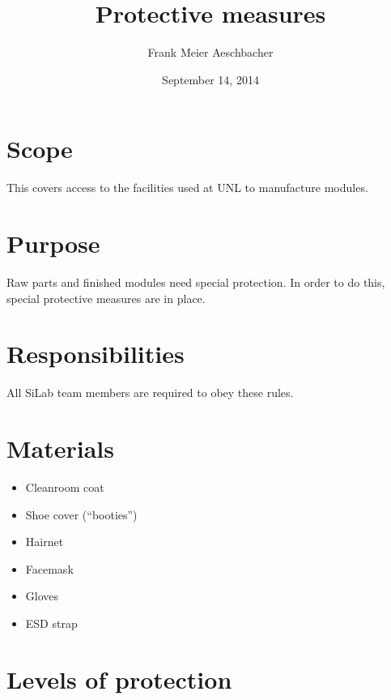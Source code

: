 \documentclass[12pt]{unlsilabsop}
\title{Protective measures}
\date{September 14, 2014}
\author{Frank Meier Aeschbacher}
\begin{document}
\maketitle

\section{Scope}
This covers access to the facilities used at UNL to manufacture modules.

\section{Purpose}
Raw parts and finished modules need special protection. In order to do this, special protective measures are in place.


\section{Responsibilities}
All SiLab team members are required to obey these rules.

\section{Materials}
\begin{itemize}
    \item Cleanroom coat
    \item Shoe cover (``booties'')
    \item Hairnet
    \item Facemask
    \item Gloves
    \item ESD strap
\end{itemize}

\section{Levels of protection}
\end{document}

